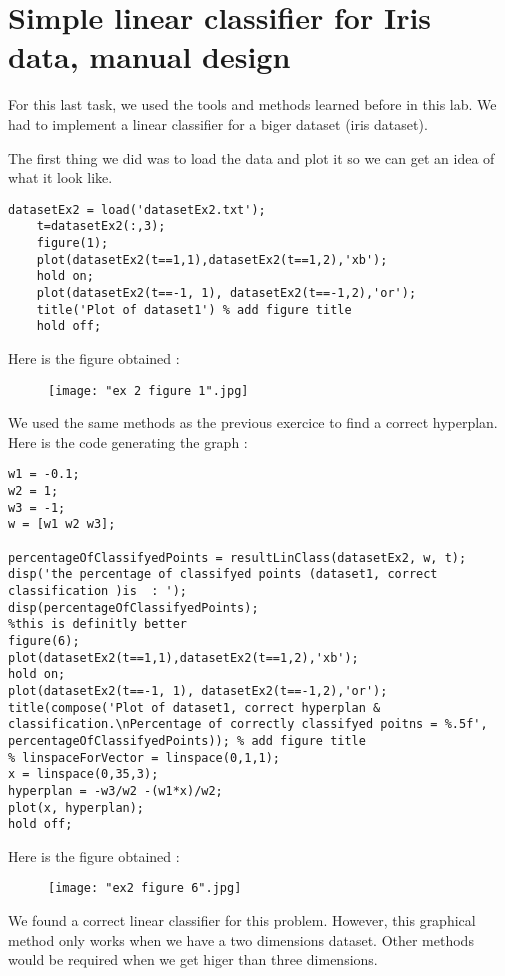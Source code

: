 \documentclass[a4paper]{article}
\begin{document}
	
		
\pagebreak

\section{Simple linear classifier for Iris data, manual design}
For this last task, we used the tools and methods learned before in this lab. We had to implement a linear classifier for a biger dataset (iris dataset).

The first thing we did was to load the data and plot it so we can get an idea of what it look like.

\begin{lstlisting}[frame=single]
	datasetEx2 = load('datasetEx2.txt');
	t=datasetEx2(:,3);
	figure(1);
	plot(datasetEx2(t==1,1),datasetEx2(t==1,2),'xb');
	hold on;
	plot(datasetEx2(t==-1, 1), datasetEx2(t==-1,2),'or');
	title('Plot of dataset1') % add figure title
	hold off;
\end{lstlisting}

Here is the figure obtained :
\begin{figure}[h]
	\begin{center}
		\texttt{[image: "ex 2 figure 1".jpg]}
	\end{center}
\end{figure}

\pagebreak

	We used the same methods as the previous exercice to find a correct hyperplan. Here is the code generating the graph :
\begin{lstlisting}[frame=single]
w1 = -0.1;
w2 = 1;
w3 = -1;
w = [w1 w2 w3];

percentageOfClassifyedPoints = resultLinClass(datasetEx2, w, t);
disp('the percentage of classifyed points (dataset1, correct classification )is  : ');
disp(percentageOfClassifyedPoints);
%this is definitly better
figure(6);
plot(datasetEx2(t==1,1),datasetEx2(t==1,2),'xb');
hold on;
plot(datasetEx2(t==-1, 1), datasetEx2(t==-1,2),'or');
title(compose('Plot of dataset1, correct hyperplan & classification.\nPercentage of correctly classifyed poitns = %.5f', percentageOfClassifyedPoints)); % add figure title
% linspaceForVector = linspace(0,1,1);
x = linspace(0,35,3);
hyperplan = -w3/w2 -(w1*x)/w2;
plot(x, hyperplan);
hold off;
\end{lstlisting}
	
	Here is the figure obtained :
	\begin{figure}[h]
		\begin{center}
			\texttt{[image: "ex2 figure 6".jpg]}
		\end{center}
	\end{figure}
	
	We found a correct linear classifier for this problem. However, this graphical method only works when we have a two dimensions dataset. Other methods would be required when we get higer than three dimensions.

	
\end{document}
